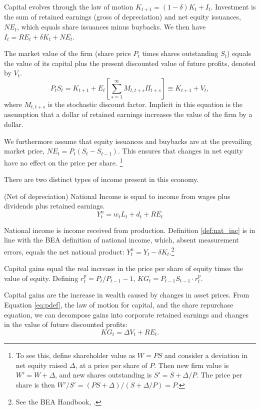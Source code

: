 \documentclass[12pt]{article}
\newcommand{\be}{\begin{equation}}
\newcommand{\ee}{\end{equation}}
\begin{document}
Capital evolves through the law of motion $K_{t+1} = (1-\delta) K_t + I_t$. Investment is the sum of retained earnings (gross of depreciation) and net equity issuances, $NE_t$, which equals share issuances minus buybacks. We then have $I_t = RE_t + \delta K_t + NE_t$. 

The market value of the firm (share price $P_t$ times shares outstanding $S_t$) equals the value of its capital plus the present discounted value of future profits, denoted by $V_t$.
\be
\label{eq:pdef}
P_t S_t = K_{t+1} + E_t[\sum_{s=1}^{\infty} M_{t,t+s} \Pi_{t+s}] \equiv K_{t+1} + V_t,
\ee
where $M_{t,t+s}$ is the stochastic discount factor. Implicit in this equation is the \citet{miller1961dividend} assumption that a dollar of retained earnings increases the value of the firm by a dollar.

We furthermore assume that equity issuances and buybacks are at the prevailing market price, $NE_t = P_t (S_t - S_{t-1})$. This ensures that changes in net equity have no effect on the price per share. \footnote{To see this, define shareholder value as $W = P S$ and consider a deviation in net equity raised $\Delta$, at a price per share of $P$. Then new firm value is $W' = W + \Delta$, and new shares outstanding is $S' = S + \Delta/P$. The price per share is then $W'/S' = (P S + \Delta) / (S + \Delta / P) = P$.}

There are two distinct types of income present in this economy. 

\begin{definition} \label{def:nat_inc} (Net of depreciation) National Income is equal to income from wages plus dividends plus retained earnings.
\be
\label{eq:nat}
Y^n_t =  w_t L_t + d_t + RE_t 
\ee
\end{definition}

National income is income received from production. Definition \ref{def:nat_inc} is in line with the BEA definition of national income, which, absent measurement errors, equals the net national product: $Y^n_t   = Y_t - \delta K_t$.\footnote{See the BEA Handbook, \citet{fox2009concepts}.}

\begin{definition} \label{def:kg} Capital gains equal the real increase in the price per share of equity times the value of equity. Defining $r^p_t = P_t / P_{t-1} - 1$, $KG_t = P_{t-1} S_{t-1} \cdot r^p_t$. \end{definition}
\noindent Capital gains are the increase in wealth caused by changes in asset prices. From Equation \ref{eq:pdef}, the law of motion for capital, and the share repurchase equation, we can decompose gains into corporate retained earnings and changes in the value of future discounted profits: 
\be
\label{eq:kgb}
KG_t = \Delta V_t + RE_t.
\ee
\end{document}
